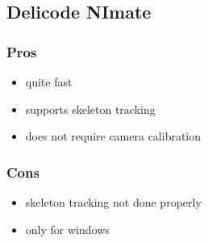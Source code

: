 \documentclass[a4paper,10pt]{report}
\begin{document}
\subsection{Delicode NImate}
\subsubsection{Pros}
\begin{itemize}
 \item quite fast
 \item supports skeleton tracking
 \item does not require camera calibration
\end{itemize}
\subsubsection{Cons}
\begin{itemize}
 \item skeleton tracking not done properly
 \item only for windows
\end{itemize}
\end{document}

